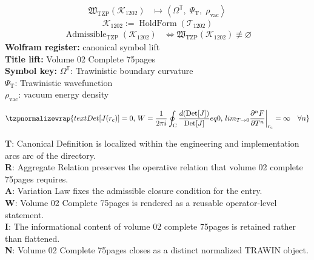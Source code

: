\noindent
\begin{minipage}[t]{0.48\linewidth}
\begingroup
\small
\[
\begin{aligned}
\mathfrak{W}_{\mathrm{TZP}}\!\left(\mathcal{K}_{1202}\right)
&\longmapsto
\left\langle \Omega^{\mathbb{T}},\; \Psi_{\mathrm{T}},\; \rho_{\mathrm{vac}} \right\rangle
\end{aligned}
\]
\[
\mathcal{K}_{1202}
:=
\operatorname{HoldForm}\!\left(\mathcal{T}_{1202}\right)
\]
\[
\begin{aligned}
\operatorname{Admissible}_{\mathrm{TZP}}\!\left(\mathcal{K}_{1202}\right)
&\Longleftrightarrow
\mathfrak{W}_{\mathrm{TZP}}\!\left(\mathcal{K}_{1202}\right)\not\equiv\varnothing
\end{aligned}
\]
\textbf{Wolfram register:} canonical symbol lift\\
\textbf{Title lift:} Volume 02 Complete 75pages\\
\textbf{Symbol key:} \(\Omega^{\mathbb{T}}\): Trawinistic boundary curvature\\ \(\Psi_{\mathrm{T}}\): Trawinistic wavefunction\\ \(\rho_{\mathrm{vac}}\): vacuum energy density
\par
\endgroup
\end{minipage}\hfill
\begin{minipage}[t]{0.48\linewidth}
\[
\tzpnormalizewrap{text{Det}[J(r_{\mathrm{c}})] = 0,\,W = \frac{1}{2\pi i} \oint_{\mathrm{C}} \frac{d(\text{Det}[J])}{{\rm Det}[J]}  eq 0,\,lim_{T \to 0} \frac{\partial^n F}{\partial T^n}\bigg|_{r_{\mathrm{c}}} = \infty \quad \forall n}
\]

\small
\textbf{T}: Canonical Definition is localized within the engineering and implementation arcs arc of the directory.\\
\textbf{R}: Aggregate Relation preserves the operative relation that volume 02 complete 75pages requires.\\
\textbf{A}: Variation Law fixes the admissible closure condition for the entry.\\
\textbf{W}: Volume 02 Complete 75pages is rendered as a reusable operator-level statement.\\
\textbf{I}: The informational content of volume 02 complete 75pages is retained rather than flattened.\\
\textbf{N}: Volume 02 Complete 75pages closes as a distinct normalized TRAWIN object.
\normalsize
\end{minipage}


